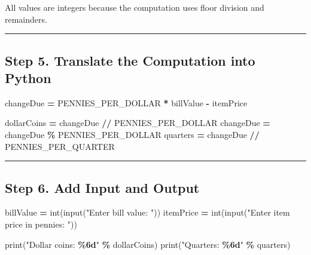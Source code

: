 \documentclass[
]{article}
\newenvironment{Shaded}{\begin{snugshade}}{\end{snugshade}}
\newcommand{\BuiltInTok}[1]{#1}
\newcommand{\NormalTok}[1]{#1}
\newcommand{\OperatorTok}[1]{\textcolor[rgb]{0.81,0.36,0.00}{\textbf{#1}}}
\newcommand{\SpecialCharTok}[1]{\textcolor[rgb]{0.81,0.36,0.00}{\textbf{#1}}}
\newcommand{\StringTok}[1]{\textcolor[rgb]{0.31,0.60,0.02}{#1}}
\begin{document}
All values are integers because the computation uses floor division and
remainders.

\begin{center}\rule{0.5\linewidth}{0.5pt}\end{center}

\subsection{Step 5. Translate the Computation into
Python}\label{step-5.-translate-the-computation-into-python}

\begin{Shaded}
\begin{Highlighting}[]
\NormalTok{changeDue }\OperatorTok{=}\NormalTok{ PENNIES\_PER\_DOLLAR }\OperatorTok{*}\NormalTok{ billValue }\OperatorTok{{-}}\NormalTok{ itemPrice}

\NormalTok{dollarCoins }\OperatorTok{=}\NormalTok{ changeDue }\OperatorTok{//}\NormalTok{ PENNIES\_PER\_DOLLAR}
\NormalTok{changeDue }\OperatorTok{=}\NormalTok{ changeDue }\OperatorTok{\%}\NormalTok{ PENNIES\_PER\_DOLLAR}
\NormalTok{quarters }\OperatorTok{=}\NormalTok{ changeDue }\OperatorTok{//}\NormalTok{ PENNIES\_PER\_QUARTER}
\end{Highlighting}
\end{Shaded}

\begin{center}\rule{0.5\linewidth}{0.5pt}\end{center}

\subsection{Step 6. Add Input and
Output}\label{step-6.-add-input-and-output}

\begin{Shaded}
\begin{Highlighting}[]
\NormalTok{billValue }\OperatorTok{=} \BuiltInTok{int}\NormalTok{(}\BuiltInTok{input}\NormalTok{(}\StringTok{"Enter bill value: "}\NormalTok{))}
\NormalTok{itemPrice }\OperatorTok{=} \BuiltInTok{int}\NormalTok{(}\BuiltInTok{input}\NormalTok{(}\StringTok{"Enter item price in pennies: "}\NormalTok{))}

\BuiltInTok{print}\NormalTok{(}\StringTok{"Dollar coins: }\SpecialCharTok{\%6d}\StringTok{"} \OperatorTok{\%}\NormalTok{ dollarCoins)}
\BuiltInTok{print}\NormalTok{(}\StringTok{"Quarters:     }\SpecialCharTok{\%6d}\StringTok{"} \OperatorTok{\%}\NormalTok{ quarters)}
\end{Highlighting}
\end{Shaded}
\end{document}
